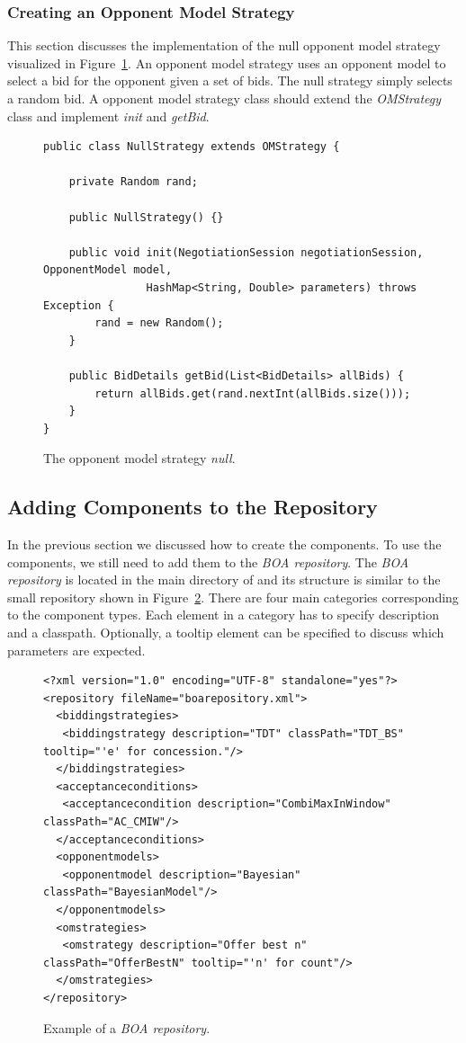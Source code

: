 \documentclass[]{article}
\begin{document}
\subsubsection{Creating an Opponent Model Strategy}
This section discusses the implementation of the null opponent model strategy visualized in Figure~\ref{code:nulloms}. An opponent model strategy uses an opponent model to select a bid for the opponent given a set of bids. The null strategy simply selects a random bid. A opponent model strategy class should extend the \textit{OMStrategy} class and implement \textit{init} and \textit{getBid}.

\begin{figure}[h!]
\begin{lstlisting}[basicstyle=\small]
public class NullStrategy extends OMStrategy {

	private Random rand;
	
	public NullStrategy() {}
	
	public void init(NegotiationSession negotiationSession, OpponentModel model,
				HashMap<String, Double> parameters) throws Exception {
		rand = new Random();
	}
	
	public BidDetails getBid(List<BidDetails> allBids) {
		return allBids.get(rand.nextInt(allBids.size()));
	}
}
\end{lstlisting}
\caption{The opponent model strategy \textit{null}.}\label{code:nulloms}
\end{figure}

\subsection{Adding Components to the Repository}
In the previous section we discussed how to create the components. To use the components, we still need to add them to the \textit{BOA repository}. The \textit{BOA repository} is located in the main directory of \Genius and its structure is similar to the small repository shown in Figure~\ref{code:boarep}. There are four main categories corresponding to the component types. Each element in a category has to specify description and a classpath. Optionally, a tooltip element can be specified to discuss which parameters are expected.

\begin{figure}[h!]
\begin{lstlisting}[basicstyle=\small]
<?xml version="1.0" encoding="UTF-8" standalone="yes"?>
<repository fileName="boarepository.xml">
  <biddingstrategies>
   <biddingstrategy description="TDT" classPath="TDT_BS" tooltip="'e' for concession."/>
  </biddingstrategies>
  <acceptanceconditions>
   <acceptancecondition description="CombiMaxInWindow" classPath="AC_CMIW"/>	
  </acceptanceconditions>
  <opponentmodels>
   <opponentmodel description="Bayesian" classPath="BayesianModel"/>
  </opponentmodels>
  <omstrategies>
   <omstrategy description="Offer best n" classPath="OfferBestN" tooltip="'n' for count"/>
  </omstrategies>
</repository>
\end{lstlisting}
\caption{Example of a \textit{BOA repository}.}\label{code:boarep}
\end{figure}
\end{document}
